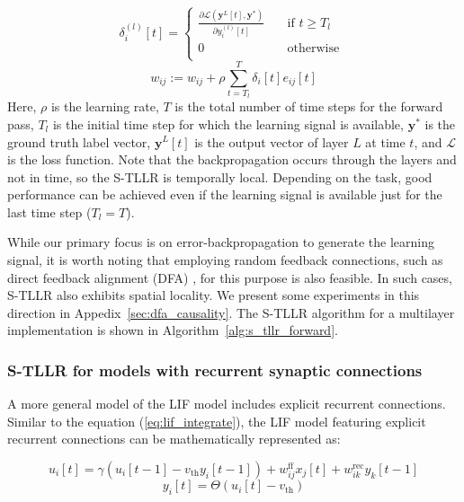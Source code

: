 \documentclass[10pt]{article} %
\begin{document}
    \begin{equation}
    \label{eq:learning_signal}
    \delta_i^{(l)}[t] = 
         \begin{cases}
           \frac{\partial \mathcal{L}(\boldsymbol{y}^L[t],\boldsymbol{y^*})}{\partial y^{(l)}_i[t]} &\quad\text{if }t\ge T_l\\
           0 &\quad\text{otherwise }\\ 
         \end{cases}
    \end{equation}
    \begin{equation}
    \label{eq:stllr_weight_update}
        w_{ij}:=w_{ij} + \rho \sum_{t=T_{l}}^T\delta_i[t]e_{ij}[t]
    \end{equation}
    Here, $\rho$ is the learning rate, $T$ is the total number of time steps for the forward pass, $T_l$ is the initial time step for which the learning signal is available, $\boldsymbol{y^*}$ is the ground truth label vector, $\boldsymbol{y}^L[t]$ is the output vector of layer $L$ at time $t$, and $\mathcal{L}$ is the loss function. 
    Note that the backpropagation occurs through the layers and not in time, so the S-TLLR is temporally local.
    Depending on the task, good performance can be achieved even if the learning signal is available just for the last time step ($T_l=T$). 
   
    While our primary focus is on error-backpropagation to generate the learning signal, it is worth noting that employing random feedback connections, such as direct feedback alignment (DFA) \citep{Trondheim2016DirectNetworks, Frenkel2021LearningNetworks}, for this purpose is also feasible. 
    In such cases, S-TLLR also exhibits spatial locality. 
    We present some experiments in this direction in Appedix~\ref{sec:dfa_causality}. 
    The S-TLLR algorithm for a multilayer implementation is shown in Algorithm~\ref{alg:s_tllr_forward}.

    \subsubsection{S-TLLR for models with recurrent synaptic connections }\label{sec:recurrent_snns}
    A more general model of the LIF model includes explicit recurrent connections. 
    Similar to the equation (\ref{eq:lif_integrate}), the LIF model featuring explicit recurrent connections can be mathematically represented as:
    
    \begin{equation}
        \label{eq:lif_integrate_recurrent}
        u_{i}[t] = \gamma (u_{i}[t-1] - v_{\text{th}}y_{i}[t-1]) + w^{\text{ff}}_{ij}x_{j}[t]+ w^{\text{rec}}_{ik}y_{k}[t-1]
    \end{equation}
    \begin{equation}
        \label{eq:lif_fire_recurrent}
        y_{i}[t] = \Theta(u_{i}[t]-v_{\text{th}})
    \end{equation}
    
\end{document}
